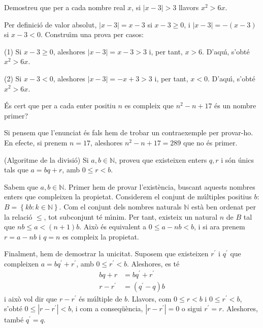 \begin{exercici}
Demostreu que per a cada nombre real $x$, si $\left\vert x-3\right\vert >3$
llavors $x^{2}>6x$.
\end{exercici}

\begin{solucio}
Per definici\'{o} de valor absolut, $\left\vert x-3\right\vert =x-3$ si
$x-3\geq0$, i $\left\vert x-3\right\vert =-\left(  x-3\right)  $ si $x-3<0$.
Constru\"{\i}m una prova per casos:

(1) Si $x-3\geq0$, aleshores $\left\vert x-3\right\vert =x-3>3$ i, per tant,
$x>6$. D'aqu\'{\i}, s'obt\'{e} $x^{2}>6x$.

(2) Si $x-3<0$, aleshores $\left\vert x-3\right\vert =-x+3>3$ i, per tant,
$x<0$. D'aqu\'{\i}, s'obt\'{e} $x^{2}>6x$.
\end{solucio}

\begin{exercici}
\'{E}s cert que per a cada enter positiu $n$ es compleix que $n^{2}-n+17$
\'{e}s un nombre primer?
\end{exercici}

\begin{solucio}
Si pensem que l'enunciat \'{e}s fals hem de trobar un contraexemple per
provar-ho. En efecte, si prenem $n=17$, aleshores $n^{2}-n+17=289$ que no
\'{e}s primer.
\end{solucio}

\begin{exercici}
(Algoritme de la divisi\'{o}) Si $a,b\in\mathbb{N}$, proveu que existeixen
enters $q,r$ i s\'{o}n \'{u}nics tals que $a=bq+r$, amb $0\leq r<b$.
\end{exercici}

\begin{solucio}
Sabem que $a,b\in\mathbb{N}$. Primer hem de provar l'exist\`{e}ncia, buscant
aquests nombres enters que compleixen la propietat. Considerem el conjunt de
m\'{u}ltiples positius $b$: $B=\left\{  kb:k\in\mathbb{N}\right\}  $. Com el
conjunt dels nombres naturals $\mathbb{N}$ est\`{a} ben ordenat per la
relaci\'{o} $\leq$, tot subconjunt t\'{e} m\'{\i}nim. Per tant, existeix un
natural $n$ de $B$ tal que $nb\leq a<(n+1)b$. Aix\`{o} \'{e}s equivalent a
$0\leq a-nb<b$, i si ara prenem $r=a-nb$ i $q=n$ es compleix la propietat.

Finalment, hem de demostrar la unicitat. Suposem que existeixen $r^{\prime}$ i
$q^{\prime}$ que compleixen $a=bq^{\prime}+r^{\prime}$, amb $0\leq r^{\prime
}<b$. Aleshores, es t\'{e}%
\begin{align*}
bq+r  &  =bq^{\prime}+r^{\prime}\\
r-r^{\prime}  &  =(q^{\prime}-q)b
\end{align*}
i aix\`{o} vol dir que $r-r^{\prime}$ \'{e}s m\'{u}ltiple de $b$. Llavors, com
$0\leq r<b$ i $0\leq r^{\prime}<b$, s'obt\'{e} $0\leq\left\vert r-r^{\prime
}\right\vert <b$, i com a conseq\"{u}\`{e}ncia, $\left\vert r-r^{\prime
}\right\vert =0$ o sigui $r^{\prime}=r$. Aleshores, tamb\'{e} $q^{\prime}=q$.
\end{solucio}